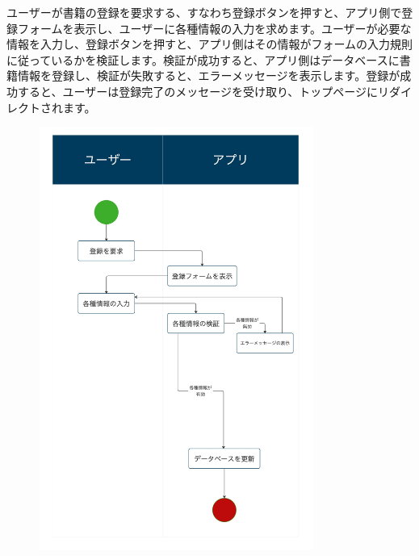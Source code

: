 \documentclass[a4paper, 11pt, titlepage]{jsarticle}
\begin{document}
ユーザーが書籍の登録を要求する、すなわち登録ボタンを押すと、アプリ側で登録フォームを表示し、ユーザーに各種情報の入力を求めます。ユーザーが必要な情報を入力し、登録ボタンを押すと、アプリ側はその情報がフォームの入力規則に従っているかを検証します。検証が成功すると、アプリ側はデータベースに書籍情報を登録し、検証が失敗すると、エラーメッセージを表示します。登録が成功すると、ユーザーは登録完了のメッセージを受け取り、トップページにリダイレクトされます。
\begin{figure}[h]
\centering
\includegraphics[width=90mm]{flow-touroku.jpg}
\label{fig:func}
\end{figure}

\clearpage
\end{document}
